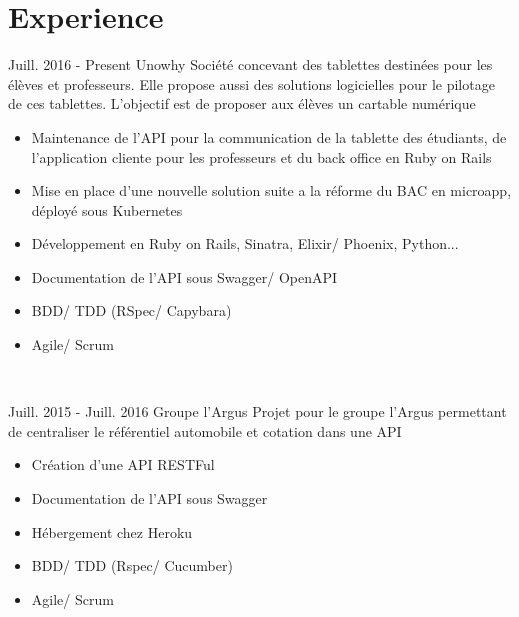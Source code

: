 \documentclass[letterpaper]{twentysecondcv} %
\begin{document}
\makeprofile %


\section{Experience}
\large

\begin{twenty} %
\twentyitem
    	{Juill. 2016 - }
		{Present}
        {Unowhy}
        {}
        {Société concevant des tablettes destinées pour les élèves et professeurs. Elle propose aussi des solutions logicielles pour le pilotage de ces tablettes. L'objectif est de proposer aux élèves un cartable numérique}
        {\begin{itemize}
        \item Maintenance de l'API pour la communication de la tablette des étudiants, de l'application cliente pour les professeurs et du back office en Ruby on Rails
        \item Mise en place d'une nouvelle solution suite a la réforme du BAC en microapp, déployé sous Kubernetes
        \item Développement en Ruby on Rails, Sinatra, Elixir/ Phoenix, Python...
        \item Documentation de l'API sous Swagger/ OpenAPI
        \item BDD/ TDD (RSpec/ Capybara)
        \item Agile/ Scrum
        
        \end{itemize}}
        \\
\end{twenty}

\begin{twenty}
	\twentyitem
    	{Juill. 2015 - }
		{Juill. 2016}
        {Groupe l'Argus}
        {}
        {Projet pour le groupe l'Argus permettant de centraliser le référentiel automobile et cotation dans une API}
        {
        {\begin{itemize}
        \item Création d'une API RESTFul
        \item Documentation de l'API sous Swagger
        \item Hébergement chez Heroku
        \item BDD/ TDD (Rspec/ Cucumber) 
        \item Agile/ Scrum

    \end{itemize}}
        }
    \\   

\end{twenty}
\end{document}
